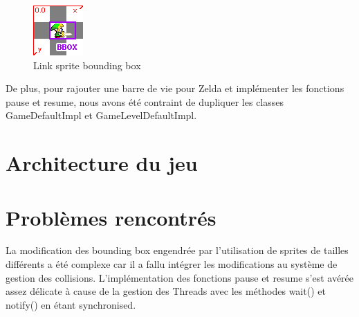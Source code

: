 \begin{figure}[ht!]
  \center
  \includegraphics{resources/bbox.png}
  \caption{Link sprite bounding box}
  \label{fig:Link sprite bounding box}
\end{figure}

De plus, pour rajouter une barre de vie pour Zelda et implémenter les fonctions pause et resume, nous avons été contraint de dupliquer les classes GameDefaultImpl et GameLevelDefaultImpl.


\section{Architecture du jeu}



\section{Problèmes rencontrés}
La modification des bounding box engendrée par l'utilisation de sprites de tailles différents a été complexe car il a fallu intégrer les modifications au système de gestion des collisions.
L'implémentation des fonctions pause et resume s'est avérée assez délicate à cause de la gestion des Threads avec les méthodes wait() et notify() en étant synchronised.